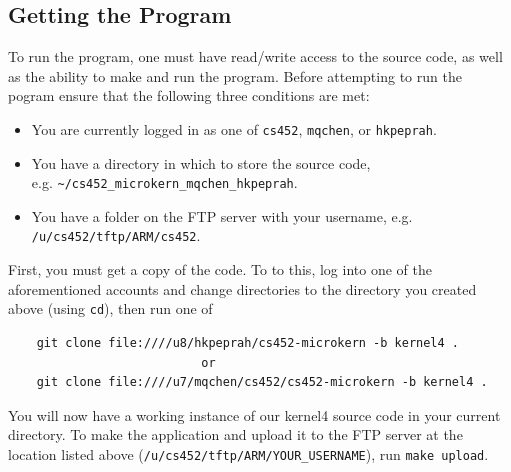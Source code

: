 \documentclass[12pt]{article}
\begin{document}
\subsection{Getting the Program}
To run the program, one must have read/write access to the source code, as well as the ability to make and run the program.  Before attempting to run the pogram ensure that the following three conditions are met:
\begin{itemize}
  \item You are currently logged in as one of \texttt{cs452}, \texttt{mqchen}, or \texttt{hkpeprah}.
  \item You have a directory in which to store the source code, \\ e.g. \texttt{\textasciitilde/cs452\_microkern\_mqchen\_hkpeprah}.
  \item You have a folder on the FTP server with your username, e.g. \texttt{/u/cs452/tftp/ARM/cs452}.
\end{itemize}
First, you must get a copy of the code.  To to this, log into one of the aforementioned accounts and change directories to the directory you created above (using \texttt{cd}), then run one of
\begin{center}
  \begin{verbatim}
    git clone file:////u8/hkpeprah/cs452-microkern -b kernel4 .
                           or
    git clone file:////u7/mqchen/cs452/cs452-microkern -b kernel4 .
  \end{verbatim}
\end{center}
\vspace{-0.5cm}You will now have a working instance of our kernel4 source code in your current directory.  To make the application and upload it to the FTP server at the location listed above (\texttt{/u/cs452/tftp/ARM/YOUR\_USERNAME}), run \texttt{make upload}.
\\[1\baselineskip]
\end{document}
